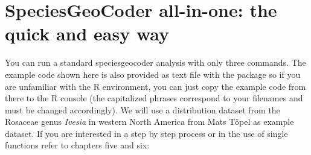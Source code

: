 \documentclass[a4paper,titlepage,11pt]{scrreprt}
\begin{document}
\chapter{SpeciesGeoCoder all-in-one: the quick and easy way} \label{allinone}

You can run a standard speciesgeocoder analysis with only three commands. The example code shown here is also provided as text file with the package so if you are unfamiliar with the R environment, you can just copy the example code from there to the R console (the capitalized phrases correspond to your filenames and must be changed accordingly). We will use a distribution dataset from the Rosaceae genus \textit{Ivesia} in western North America from Mats T\"opel \citep{topel2012} as example dataset. If you are interested in a step by step process or in the use of single functions refer to chapters five and six:
\end{document}

